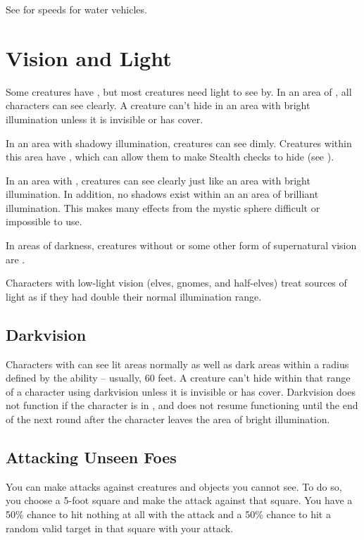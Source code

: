          See  for speeds for water vehicles.

\section{Vision and Light}\label{Vision and Light}
    Some creatures have , but most creatures need light to see by. 
    In an area of , all characters can see clearly.
    A creature can't hide in an area with bright illumination unless it is invisible or has cover.

    In an area with shadowy illumination, creatures can see dimly.
    Creatures within this area have \concealment, which can allow them to make Stealth checks to hide (see ).

    In an area with , creatures can see clearly just like an area with bright illumination.
    In addition, no shadows exist within an an area of brilliant illumination.
    This makes many effects from the  mystic sphere difficult or impossible to use.

    In areas of darkness, creatures without  or some other form of supernatural vision are \blinded.

    Characters with low-light vision (elves, gnomes, and half-elves) treat sources of light as if they had double their normal illumination range.

    \subsection{Darkvision}\label{Darkvision}
        Characters with  can see lit areas normally as well as dark areas within a radius defined by the ability -- usually, 60 feet.
        A creature can't hide within that range of a character using darkvision unless it is invisible or has cover.
        Darkvision does not function if the character is in , and does not resume functioning until the end of the next round after the character leaves the area of bright illumination.

    \subsection{Attacking Unseen Foes}
        You can make attacks against creatures and objects you cannot see.
        To do so, you choose a 5-foot square and make the attack against that square.
        You have a 50\% chance to hit nothing at all with the attack and a 50\% chance to hit a random valid target in that square with your attack.

